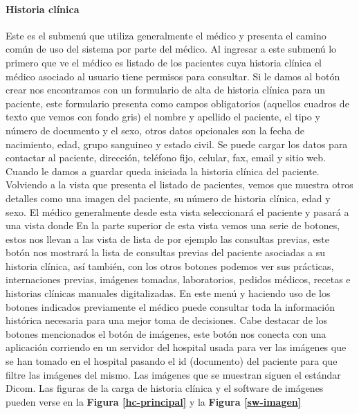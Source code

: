 \paragraph{Historia clínica}

Este es el submenú que utiliza generalmente el médico y presenta el camino común de uso del sistema por parte del médico. Al ingresar a este submenú lo primero que ve el médico es listado de los pacientes cuya historia clínica el médico asociado al usuario tiene permisos para consultar.
Si le damos al botón crear nos encontramos con un formulario de alta de historia clínica para un paciente, este formulario presenta como campos obligatorios (aquellos cuadros de texto que vemos con fondo gris) el nombre y apellido el paciente, el tipo y número de documento y el sexo, otros datos opcionales son la fecha de nacimiento, edad, grupo sanguineo y estado civil. Se puede cargar los datos para contactar al paciente, dirección, teléfono fijo, celular, fax, email y sitio web. Cuando le damos a guardar queda iniciada la historia clínica del paciente.
Volviendo a la vista que presenta el listado de pacientes, vemos que muestra otros detalles como una imagen del paciente, su número de historia clínica, edad y sexo. El médico generalmente desde esta vista seleccionará el paciente y pasará a una vista donde
En la parte superior de esta vista vemos una serie de botones, estos nos llevan a las vista de lista de por ejemplo las consultas previas, este botón nos mostrará la lista de consultas previas del paciente asociadas a su historia clínica, así también, con los otros botones podemos ver sus prácticas, internaciones previas, imágenes tomadas, laboratorios, pedidos médicos, recetas e historias clínicas manuales digitalizadas. En este menú y haciendo uso de los botones indicados previamente el médico puede consultar toda la información histórica necesaria para una mejor toma de decisiones. 
Cabe destacar de los botones mencionados el botón de imágenes, este botón nos conecta con una aplicación corriendo en un servidor del hospital usada para ver las imágenes que se han tomado en el hospital pasando el id (documento) del paciente para que filtre las imágenes del mismo. Las imágenes que se muestran siguen el estándar Dicom. Las figuras de la carga de historia clínica y el software de imágenes pueden verse en la \textbf{Figura \ref{hc-principal}} y la \textbf{Figura \ref{sw-imagen}}

